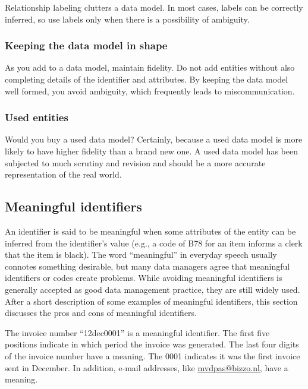 \documentclass[
]{article}
\begin{document}
Relationship labeling clutters a data model. In most cases, labels can
be correctly inferred, so use labels only when there is a possibility of
ambiguity.

\hypertarget{keeping-the-data-model-in-shape}{%
\subsubsection*{Keeping the data model in shape}\label{keeping-the-data-model-in-shape}}

As you add to a data model, maintain fidelity. Do not add entities
without also completing details of the identifier and attributes. By
keeping the data model well formed, you avoid ambiguity, which
frequently leads to miscommunication.

\hypertarget{used-entities}{%
\subsubsection*{Used entities}\label{used-entities}}

Would you buy a used data model? Certainly, because a used data model is
more likely to have higher fidelity than a brand new one. A used data
model has been subjected to much scrutiny and revision and should be a
more accurate representation of the real world.

\hypertarget{meaningful-identifiers}{%
\subsection*{Meaningful identifiers}\label{meaningful-identifiers}}

An identifier is said to be meaningful when some attributes of the
entity can be inferred from the identifier's value (e.g., a code of B78
for an item informs a clerk that the item is black). The word
``meaningful'' in everyday speech usually connotes something desirable,
but many data managers agree that meaningful identifiers or codes create
problems. While avoiding meaningful identifiers is generally accepted as
good data management practice, they are still widely used. After a short
description of some examples of meaningful identifiers, this section
discusses the pros and cons of meaningful identifiers.

The invoice number ``12dec0001'' is a meaningful identifier. The first
five positions indicate in which period the invoice was generated. The
last four digits of the invoice number have a meaning. The 0001
indicates it was the first invoice sent in December. In addition, e-mail
addresses, like \href{mailto:mvdpas@bizzo.nl}{\underline{mvdpas@bizzo.nl}}, have
a meaning.
\end{document}
